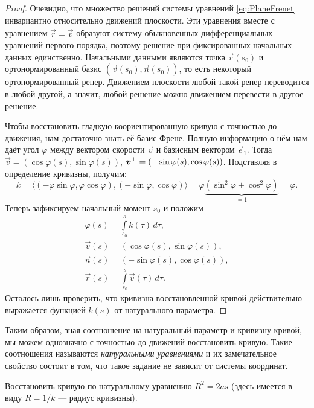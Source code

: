 \begin{proof}
	Очевидно, что множество решений системы уравнений \eqref{eq:PlaneFrenet} инвариантно относительно движений плоскости. Эти уравнения вместе с уравнением $\dot{\vec{r}} = \vec{v}$ образуют систему обыкновенных дифференциальных уравнений первого порядка, поэтому решение при фиксированных начальных данных единственно. Начальными данными являются точка $\vec{r}(s_0)$ и ортонормированный базис $(\vec{v}(s_0), \vec{n}(s_0))$, то есть некоторый ортонормированный репер. Движением плоскости любой такой репер переводится в любой другой, а значит, любой решение можно движением перевести в другое решение.

	Чтобы восстановить гладкую коориентированную кривую с точностью до движения, нам достаточно знать её базис Френе. Полную информацию о нём нам даёт угол $\varphi$ между вектором скорости $\vec{v}$ и базисным вектором $\vec{e}_1$. Тогда $\vec{v} = (\cos\varphi(s), \sin\varphi(s))$, $\vec{v}^\perp \hm= (-\sin\varphi(s), \cos\varphi(s))$. Подставляя в определение кривизны, получим:
	\begin{equation} \label{eq:AngleByCurvature}
		k = \big\langle(-\dot{\varphi}\sin\varphi, \dot{\varphi}\cos\varphi), (-\sin\varphi, \cos\varphi)\big\rangle = \dot{\varphi}\underbrace{(\sin^2\varphi + \cos^2\varphi)}_{= 1} = \dot{\varphi}.
	\end{equation}
	Теперь зафиксируем начальный момент $s_0$ и положим
	\begin{gather*}
		\varphi(s) = \int\limits_{s_0}^sk(\tau)\,d\tau,\\
		\vec{v}(s) = (\cos\varphi(s), \sin\varphi(s)),\\
		\vec{n}(s) = (-\sin\varphi(s), \cos\varphi(s)),\\
		\vec{r}(s) = \int\limits_{s_0}^s\vec{v}(\tau)\,d\tau.
	\end{gather*}
	Осталось лишь проверить, что кривизна восстановленной кривой действительно выражается функцией $k(s)$ от натурального параметра.
\end{proof}

Таким образом, зная соотношение на натуральный параметр и кривизну кривой, мы можем однозначно с точностью до движений восстановить кривую. Такие соотношения называются \textit{натуральными уравнениями} и их замечательное свойство состоит в том, что такое задание не зависит от системы координат.

\begin{problem} \label{problem:NaturalEquation}
	Восстановить кривую по натуральному уравнению $R^2 = 2as$ (здесь имеется в виду $R = 1 / k$ --- радиус кривизны\footnotemark).
\end{problem}

